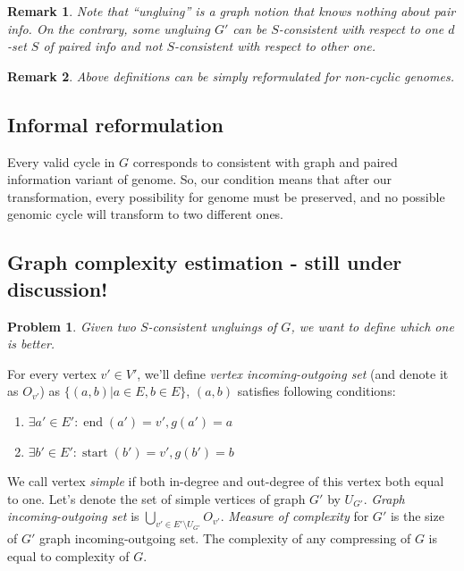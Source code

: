 \documentclass[12pt,a4paper,oneside]{article}
\newtheorem{problem}{Problem}
\newtheorem{remark}{Remark}
\begin{document}
\begin{remark}
  Note that ``ungluing'' is a graph notion that knows nothing about pair info. On the contrary, some ungluing $G'$ can be $S$-consistent with respect to one $d$-set $S$ of paired info and not $S$-consistent with respect to other one.
\end{remark}


\begin{remark}
Above definitions can be simply reformulated for non-cyclic genomes.
\end{remark}
\subsection{Informal reformulation}
Every valid cycle in $G$ corresponds to consistent with graph and paired information variant of genome. So, our condition means that after our transformation, every possibility for genome must be preserved, and no possible genomic cycle will transform to two different ones.


\subsection{Graph complexity estimation - still under discussion!}
\begin{problem}
  Given two $S$-consistent ungluings of $G$, we want to define which one is better.
\end{problem}
  For every vertex $v' \in V'$, we'll define \emph{vertex incoming-outgoing set} (and denote it as $O_{v'}$)  as $\{(a, b)| a\in E, b\in E\}$, $(a, b)$ satisfies following conditions:
\begin{enumerate}
 \item $\exists a' \in E' : \mathop{end}(a')=v', g(a') = a$
 \item $\exists b' \in E' : \mathop{start}(b')=v', g(b') = b$
\end{enumerate}
 We call vertex \emph{simple} if both in-degree and out-degree of this vertex both equal to one. Let's denote the set of simple vertices of graph $G'$ by $U_{G'}$. 
\emph{Graph incoming-outgoing set} is $\bigcup\limits_{v'\in E'\setminus U_{G'}}  O_{v'}$.
\emph{Measure of complexity} for $G'$ is the size of $G'$ graph incoming-outgoing set.
The complexity of any compressing of $G$ is equal to complexity of $G$.
\end{document}
